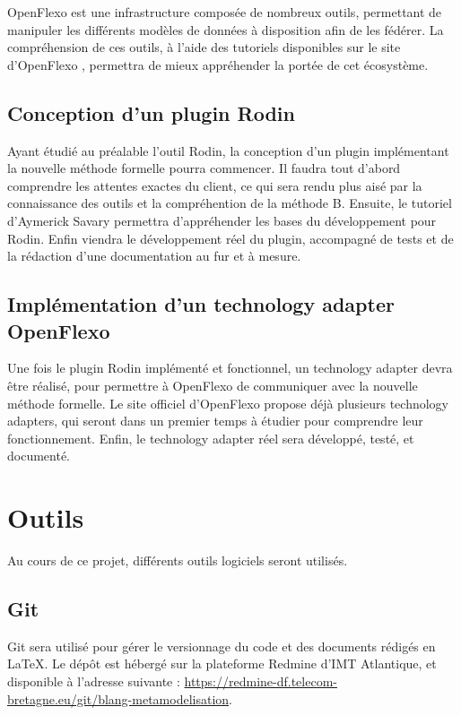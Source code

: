 \documentclass{article}
\begin{document}
OpenFlexo est une infrastructure composée de nombreux outils, permettant de manipuler les différents modèles de données à disposition afin de les fédérer.
La compréhension de ces outils, à l'aide des tutoriels disponibles sur le site d'OpenFlexo \cite{openflexodoc}, permettra de mieux appréhender la portée de cet écosystème.

\subsection{Conception d'un plugin Rodin}

Ayant étudié au préalable l'outil Rodin, la conception d'un plugin implémentant la nouvelle méthode formelle pourra commencer.
Il faudra tout d'abord comprendre les attentes exactes du client, ce qui sera rendu plus aisé par la connaissance des outils et la compréhention de la méthode B.
Ensuite, le tutoriel d'Aymerick Savary \cite{asavary} permettra d'appréhender les bases du développement pour Rodin.
Enfin viendra le développement réel du plugin, accompagné de tests et de la rédaction d'une documentation au fur et à mesure.

\subsection{Implémentation d'un technology adapter OpenFlexo}

Une fois le plugin Rodin implémenté et fonctionnel, un technology adapter devra être réalisé, pour permettre à OpenFlexo de communiquer avec la nouvelle méthode formelle.
Le site officiel d'OpenFlexo \cite{openflexodoc} propose déjà plusieurs technology adapters, qui seront dans un premier temps à étudier pour comprendre leur fonctionnement.
Enfin, le technology adapter réel sera développé, testé, et documenté.

\section{Outils}

Au cours de ce projet, différents outils logiciels seront utilisés.

\subsection{Git}

Git sera utilisé pour gérer le versionnage du code et des documents rédigés en \LaTeX.
Le dépôt est hébergé sur la plateforme Redmine d'IMT Atlantique, et disponible à l'adresse suivante : \href{%
    https://redmine-df.telecom-bretagne.eu/git/blang-metamodelisation}{https://redmine-df.telecom-bretagne.eu/git/blang-metamodelisation}.
\end{document}
